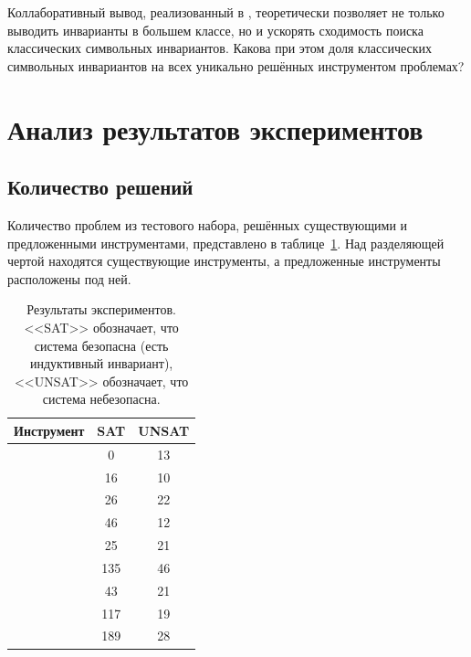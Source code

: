 \begin{resquest}\label{rq:char}
Коллаборативный вывод, реализованный в \theringenCICI{}, теоретически позволяет не только выводить инварианты в большем классе, но и ускорять сходимость поиска классических символьных инвариантов. Какова при этом доля классических символьных инвариантов на всех уникально решённых инструментом \theringenCICI{} проблемах?
\end{resquest}

\section{Анализ результатов экспериментов}

\subsection{Количество решений}

Количество проблем из тестового набора, решённых существующими и предложенными инструментами, представлено в таблице~\ref{table:eval-all}. Над разделяющей чертой находятся существующие инструменты, а предложенные инструменты расположены под ней.

\begin{table}[t]
    \caption{Результаты экспериментов. <<SAT>> обозначает, что система безопасна (есть индуктивный инвариант), <<UNSAT>> обозначает, что система небезопасна.}
    \label{table:eval-all}
    \small
    \centering
    \begin{tabular}{ |l||c|c| }
    \hline\hline
    Инструмент & SAT & UNSAT\\\hline\hline
    \cvcind{} & 0 & 13\\
    \vericat{} & 16 & 10\\
    \racer{} & 26 & 22\\
    \eldarica{} & 46 & 12\\\hline
    \ringen{\cvc{}} & 25 & 21\\
    \ringen{\vampire{}} & 135 & 46\\
    \ringenSync{} & 43 & 21\\
    \ringenCICI{\cvc{}} & 117 & 19\\
    \ringenCICI{\vampire{}} & 189 & 28\\
    \hline\hline
    \end{tabular}
\end{table}


